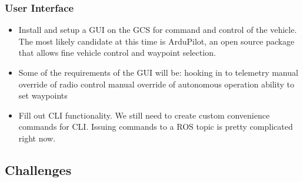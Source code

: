 \documentclass[compsoc,draftclsnofoot,onecolumn,10pt]{IEEEtran}
\begin{document}
\subsubsection{User Interface}
\begin{itemize}
	\item Install and setup a GUI on the GCS for command and control of the vehicle. The most likely candidate at this time is ArduPilot, an open source package that allows fine vehicle control and waypoint selection.
	\item Some of the requirements of the GUI will be:
	\subitem hooking in to telemetry
	\subitem manual override of radio control
	\subitem manual override of autonomous operation
	\subitem ability to set waypoints
	
	\item Fill out CLI functionality. We still need to create custom convenience commands for CLI. Issuing commands to a ROS topic is pretty complicated right now.\par
\end{itemize}

\subsection{Challenges}
\end{document}
